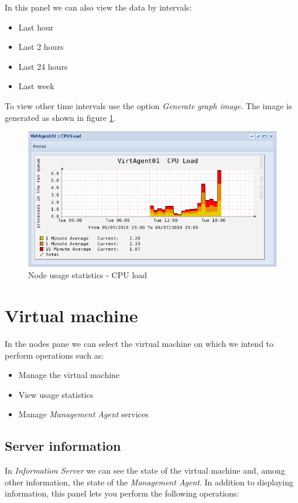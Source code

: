 In this panel we can also view the data by intervals:
\begin{itemize}
	\item Last hour
	\item Last 2 hours
	\item Last 24 hours
	\item Last week
\end{itemize}
To view other time intervals use the option \emph{Generate graph image}. The image is generated as shown in figure \ref{fig:server_stats_nodeLoadRange}.

\begin{figure}[H]
	\begin{center}
	\includegraphics[scale=0.6]{screenshots/server_stats_nodeLoadRange.png}
	\caption{Node usage statistics - CPU load}
	\label{fig:server_stats_nodeLoadRange}
	\end{center}
\end{figure}



\pagebreak

\section{Virtual machine}
\label{sec:server}
In the nodes pane we can select the virtual machine on which we intend to perform operations such as:

\begin{itemize}
        \item Manage the virtual machine
        \item View usage statistics 
        \item Manage \emph{Management Agent} services
\end{itemize}

\subsection{Server information}
In \emph{Information Server} we can see the state of the virtual machine and, among other information, the state of the \emph{Management Agent}.
In addition to displaying information, this panel lets you perform the following operations:


